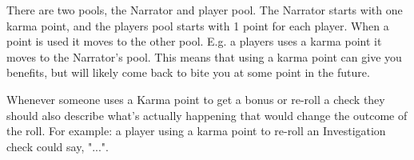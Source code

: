 



There are two pools, the Narrator and player pool. 
The Narrator starts with one karma point, and the players pool starts with 1 point for each player.
When a point is used it moves to the other pool. E.g. a players uses a karma point it moves to the Narrator's pool.
This means that using a karma point can give you benefits, but will likely come back to bite you at some point in the future.
  
Whenever someone uses a Karma point to get a bonus or re-roll a check 
they should also describe what's actually happening that would change the outcome of the roll.
For example: a player using a karma point to re-roll an Investigation check could say, 
"...".

